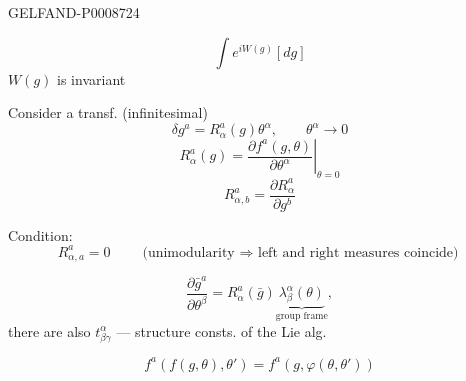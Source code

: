 \begin{GelfandAdjacentEvidence}{GELFAND-P000872}{4}

\begin{equation*}
\int e^{iW(g)}[dg]
\tag{12}
\end{equation*}
$W(g)$ is invariant

Consider a transf. (infinitesimal)
\begin{equation*}
\delta g^a=R_\alpha^a(g)\theta^\alpha,\qquad\theta^\alpha\to0
\tag{13}
\end{equation*}
\begin{equation*}
R_\alpha^a(g)=\left.\frac{\partial f^a(g,\theta)}{\partial\theta^\alpha}\right|_{\theta=0}
\tag{14}
\end{equation*}
\begin{equation*}
R_{\alpha,b}^a=\frac{\partial R_\alpha^a}{\partial g^b}
\tag{15}
\end{equation*}
\end{GelfandAdjacentEvidence}


Condition:
\begin{equation*}
R_{\alpha,a}^a=0
\qquad\text{(unimodularity $\Rightarrow$ left and right measures coincide)}
\tag{16}
\end{equation*}

\begin{equation*}
\frac{\partial\bar g^a}{\partial\theta^\beta}
=R_\alpha^a(\bar g)\underbrace{\lambda_\beta^\alpha(\theta)}_{\text{group frame}},
\tag{17}
\end{equation*}
there are also $t_{\beta\gamma}^\alpha$ --- structure consts. of the Lie alg.

\begin{equation*}
f^a(f(g,\theta),\theta')=f^a(g,\varphi(\theta,\theta'))
\tag{18}
\end{equation*}


